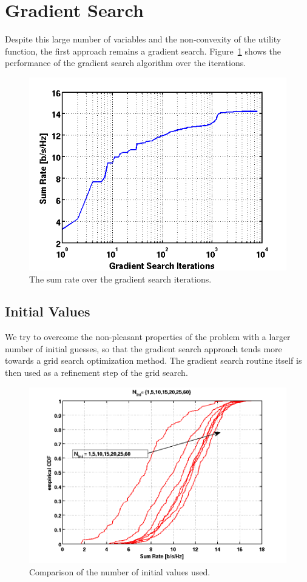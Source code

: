 \section{Gradient Search}
\label{sec:grads_solver}

Despite this large number of variables and the non-convexity of the utility function, the first approach remains a gradient search.
Figure~\ref{fig:grad_search} shows the performance of the gradient search algorithm over the iterations.

\begin{figure}
\centering
  \includegraphics[width=0.7\linewidth]{images/rvsgradCnt_7rel_18dB_6.png}
\caption{The sum rate over the gradient search iterations.}
\label{fig:grad_search}
\end{figure}


\subsection{Initial Values}
\label{sec:grads_ini}

We try to overcome the non-pleasant properties of the problem with a larger number of initial guesses, so that the gradient search approach tends more towards a grid search optimization method.
The gradient search routine itself is then used as a refinement step of the grid search.

\begin{figure}[h]
\centering
  \includegraphics[width=0.8\linewidth]{images/Inicomparison_edited.png}
\caption{Comparison of the number of initial values used.}
\label{fig:ini_comp}
\end{figure}

